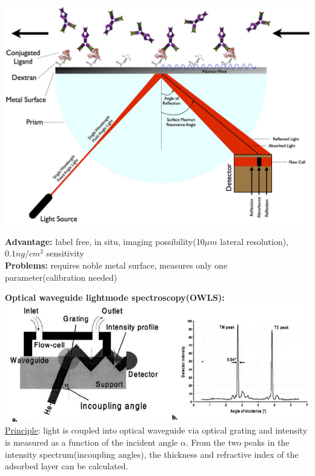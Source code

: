 \documentclass[9pt]{article}
\begin{document}
\begin{multicols}{2}
\includegraphics[width=\linewidth]{Images/Surface_Plasmon_Resonance.jpg}

\textbf{Advantage:} label free, in situ,  imaging possibility(10$\mu m$ lateral resolution), $0.1ng/cm^2$ sensitivity\\
\textbf{Problems:} requires noble metal surface, measures only one parameter(calibration needed)
				
\textbf{Optical waveguide lightmode spectroscopy(OWLS):}\\
\includegraphics[width=\linewidth]{Images/OWLS.png}
\underline{Principle}: light is coupled into optical waveguide via optical grating
and intensity is measured as a function of the incident angle $\alpha$.
From the two peaks in the intensity spectrum(incoupling angles), the thickness and
refractive index of the adsorbed layer can be calculated.\\


\end{multicols}
\end{document}
